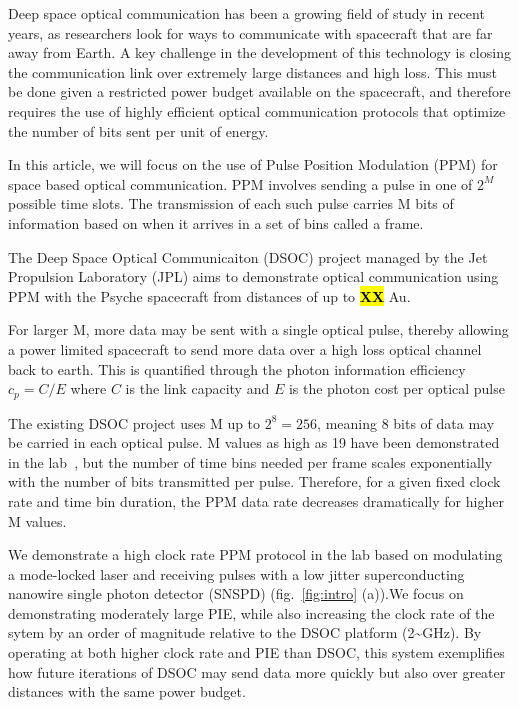 \documentclass{optica-article}
\begin{document}
Deep space optical communication has been a growing field of study in recent years, as researchers look for ways to communicate with spacecraft that are far away from Earth. A key challenge in the development of this technology is closing the communication link over extremely large distances and high loss. This must be done given a restricted power budget available on the spacecraft, and therefore requires the use of highly efficient optical communication protocols that optimize the number of bits sent per unit of energy.

In this article, we will focus on the use of Pulse Position Modulation (PPM) for space based optical communication. PPM involves sending a pulse in one of $2^M$ possible time slots. The transmission of each such pulse carries M bits of information based on when it arrives in a set of bins called a frame.

The Deep Space Optical Communicaiton (DSOC) project managed by the Jet Propulsion Laboratory (JPL) aims to demonstrate optical communication using PPM with the Psyche spacecraft from distances of up to \textbf{\hl{XX}} Au.

For larger M, more data may be sent with a single optical pulse, thereby allowing a power limited spacecraft to send more data over a high loss optical channel back to earth. This is quantified through the photon information efficiency $c_p = C/E$ where $C$ is the link capacity and $E$ is the photon cost per optical pulse

The existing DSOC project uses M up to $2^8 = 256$, meaning 8 bits of data may be carried in each optical pulse. M values as high as 19 have been demonstrated in the lab~\cite{essiambre2023record}, but the number of time bins needed per frame scales exponentially with the number of bits transmitted per pulse. Therefore, for a given fixed clock rate and time bin duration, the PPM data rate decreases dramatically for higher M values.

We demonstrate a high clock rate PPM protocol in the lab based on modulating a mode-locked laser and receiving pulses with a low jitter superconducting nanowire single photon detector (SNSPD) (fig.~\ref{fig:intro} (a)).We focus on demonstrating moderately large PIE, while also increasing the clock rate of the sytem by an order of magnitude relative to the DSOC platform (2\textasciitilde GHz). By operating at both higher clock rate and PIE than DSOC, this system exemplifies how future iterations of DSOC may send data more quickly but also over greater distances with the same power budget.
\end{document}
